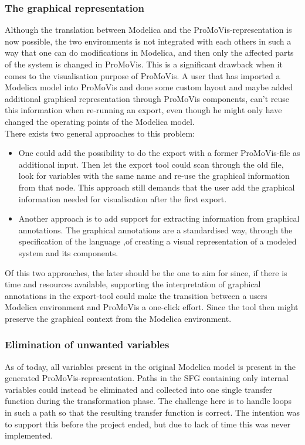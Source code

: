 \subsubsection{The graphical representation}
Although the translation between Modelica and the ProMoVis-representation is now possible, the two environments is not integrated with each others in such a way that one can do modifications in Modelica, and then only the affected parts of the system is changed in ProMoVis. This is a significant drawback when it comes to the visualisation purpose of ProMoVis. A user that has imported a Modelica model into ProMoVis and done some custom layout and maybe added additional graphical representation through ProMoVis components, can't reuse this information when re-running an export, even though he might only have changed the operating points of the Modelica model.\\\newline There exists two general approaches to this problem: 
\begin{itemize}
\item One could add the possibility to do the export with a former ProMoVis-file as additional input. Then let the export tool could scan through the old file, look for variables with the same name and re-use the graphical information from that node. This approach still demands that the user add the graphical information needed for visualisation after the first export.
\item Another approach is to add support for extracting information from graphical annotations. The graphical annotations are a standardised way, through the specification of the language \cite{ModelicaSpec}\nocite{*},of creating a visual representation of a modeled system and its components.
\end{itemize}Of this two approaches, the later should be the one to aim for since, if there is time and resources available, supporting the interpretation of graphical annotations in the export-tool could make the transition between a users Modelica environment and ProMoVis a one-click effort. Since the tool then might preserve the graphical context from the Modelica environment.
\subsubsection{Elimination of unwanted variables}
As of today, all variables present in the original Modelica model is present in the generated ProMoVis-representation. Paths in the SFG containing only internal variables could instead be eliminated and collected into one single transfer function during the transformation phase. The challenge here is to handle loops in such a path so that the resulting transfer function is correct. The intention was to support this before the project ended, but due to lack of time this was never implemented. 

